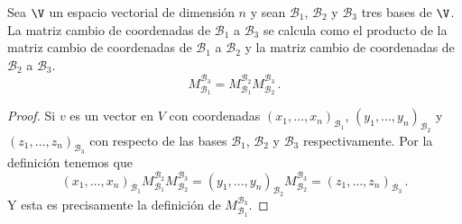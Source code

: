 \begin{prop}
  Sea $\V$ un espacio vectorial de dimensión $n$ y sean $\mathcal{B}_1$, $\mathcal{B}_2$ y $\mathcal{B}_3$ tres bases de $\V$. La matriz cambio de coordenadas de $\mathcal{B}_1$ a $\mathcal{B}_3$ se calcula como el producto de la matriz cambio de coordenadas de $\mathcal{B}_1$ a $\mathcal{B}_2$ y la matriz cambio de coordenadas de $\mathcal{B}_2$ a $\mathcal{B}_3$.
  \[
    M_{\mathcal{B}_1}^{\mathcal{B}_3} = M_{\mathcal{B}_1}^{\mathcal{B}_2}M_{\mathcal{B}_2}^{\mathcal{B}_3}\,.
  \]
\end{prop}
\begin{proof}
  Si $v$ es un vector en $V$ con coordenadas $(x_1,\dots,x_n)_{\mathcal{B}_1}$, $(y_1,\dots,y_n)_{\mathcal{B}_2}$ y $(z_1,\dots,z_n)_{\mathcal{B}_3}$ con respecto de las bases $\mathcal{B}_1$, $\mathcal{B}_2$ y $\mathcal{B}_3$ respectivamente. Por la definición tenemos que
  \[
    (x_1,\dots,x_n)_{\mathcal{B}_1} M_{\mathcal{B}_1}^{\mathcal{B}_2}M_{\mathcal{B}_2}^{\mathcal{B}_3} = (y_1,\dots,y_n)_{\mathcal{B}_2}M_{\mathcal{B}_2}^{\mathcal{B}_3} = (z_1,\dots,z_n)_{\mathcal{B}_3}\,.
  \]
  Y esta es precisamente la definición de $M_{\mathcal{B}_1}^{\mathcal{B}_3}$.
\end{proof}

